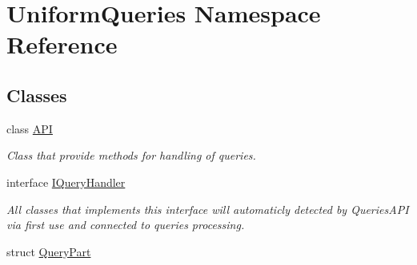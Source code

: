 \hypertarget{namespace_uniform_queries}{}\section{Uniform\+Queries Namespace Reference}
\label{namespace_uniform_queries}
\subsection*{Classes}
\begin{DoxyCompactItemize}
\item 
class \mbox{\hyperlink{class_uniform_queries_1_1_a_p_i}{A\+PI}}
\begin{DoxyCompactList}\small\item\em Class that provide methods for handling of queries. \end{DoxyCompactList}\item 
interface \mbox{\hyperlink{interface_uniform_queries_1_1_i_query_handler}{I\+Query\+Handler}}
\begin{DoxyCompactList}\small\item\em All classes that implements this interface will automaticly detected by Queries\+A\+PI via first use and connected to queries processing. \end{DoxyCompactList}\item 
struct \mbox{\hyperlink{struct_uniform_queries_1_1_query_part}{Query\+Part}}
\end{DoxyCompactItemize}
